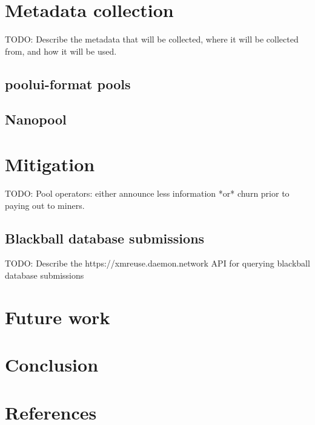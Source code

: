 \documentclass[notitlepage]{report}
\begin{document}

\section{Metadata collection}
\setcounter{chapter}{3}

TODO: Describe the metadata that will be collected, where it will be collected from, and how it will be used.

\subsection{poolui-format pools}

\subsection{Nanopool} \label{Nanopool}

\section{Mitigation}

TODO: Pool operators: either announce less information *or* churn prior to paying out to miners.

\subsection{Blackball database submissions}

TODO: Describe the https://xmreuse.daemon.network API for querying blackball database submissions

\section{Future work}

\section{Conclusion}

\section{References}
\end{document}
